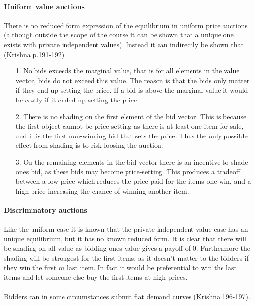 \paragraph{Uniform value auctions}
There is no reduced form expression of the equilibrium in uniform price auctions (although outside the scope of the course it can be shown that a unique one exists with private independent values). Instead it can indirectly be shown that (Krishna p.191-192)
\begin{itemize}
    \item[1.] No bids exceeds the marginal value, that is for all elements in the value vector, bids do not exceed this value. The reason is that the bids only matter if they end up setting the price. If a bid is above the marginal value it would be costly if it ended up setting the price. 
    \item[2.] There is no shading on the first element of the bid vector. This is because the first object cannot be price setting as there is at least one item for sale, and it is the first non-winning bid that sets the price. Thus the only possible effect from shading is to risk loosing the auction. 
    \item[3.] On the remaining elements in the bid vector there is an incentive to shade ones bid, as these bids may become price-setting. This produces a tradeoff between a low price which reduces the price paid for the items one win, and a high price increasing the chance of winning another item.   
\end{itemize}

\paragraph{Discriminatory auctions}
Like the uniform case it is known that the private independent value case has an unique equilibrium, but it has no known reduced form. It is clear that there will be shading on all value as bidding ones value gives a payoff of 0. Furthermore the shading will be strongest for the first items, as it doesn't matter to the bidders if they win the first or last item. In fact it would be preferential to win the last items and let someone else buy the first items at high prices. 
\\ \\
Bidders can in some circumstances submit flat demand curves (Krishna 196-197).

